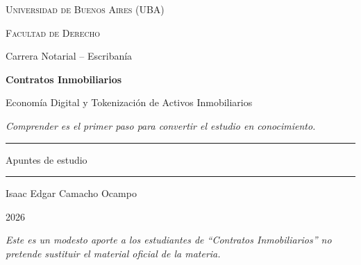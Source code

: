 \documentclass[12pt,oneside]{book}
\newcommand{\universidad}{Universidad de Buenos Aires (UBA)}
\newcommand{\facultad}{Facultad de Derecho}
\newcommand{\carrera}{Carrera Notarial -- Escribanía}
\newcommand{\materia}{Contratos Inmobiliarios}
\newcommand{\titulo}{Economía Digital y Tokenización de Activos Inmobiliarios}
\newcommand{\autor}{Isaac Edgar Camacho Ocampo}
\newcommand{\anio}{2026}
\begin{document}
\begin{titlepage}

\thispagestyle{empty}

\begin{center}

\vspace*{1cm}

{\large \textsc{\universidad}}

\vspace{0.2cm}

{\large \textsc{\facultad}}

\vspace{0.2cm}

{\large \carrera}

\vspace{3cm}

{\Huge \textbf{\materia}}

\vspace{1cm}

{\LARGE \titulo}

\vspace{0.8cm}

\textit{Comprender es el primer paso para convertir el estudio en conocimiento.}

\vspace{1.2cm}

\rule{0.70\textwidth}{0.5pt}

\vspace{0.5cm}

{\large Apuntes de estudio}

\vspace{0.5cm}

\rule{0.70\textwidth}{0.5pt}

\vfill

{\large \autor}

\vspace{0.3cm}

{\large \anio}

\end{center}

\vfill

\begin{FlushLeft}
\textit{Este es un modesto aporte a los estudiantes de ``\materia'' no pretende sustituir el material oficial de la materia.}
\end{FlushLeft}

\end{titlepage}
\end{document}
